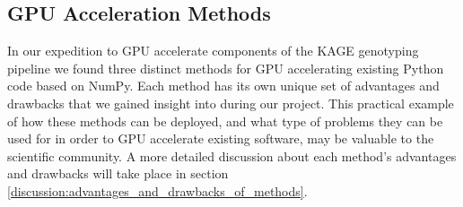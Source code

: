 \subsection{GPU Acceleration Methods}
In our expedition to GPU accelerate components of the KAGE genotyping pipeline we found three distinct methods for GPU accelerating existing Python code based on NumPy.
Each method has its own unique set of advantages and drawbacks that we gained insight into during our project.
This practical example of how these methods can be deployed, and what type of problems they can be used for in order to GPU accelerate existing software, may be valuable to the scientific community.
A more detailed discussion about each method's advantages and drawbacks will take place in section \ref{discussion:advantages_and_drawbacks_of_methods}.
